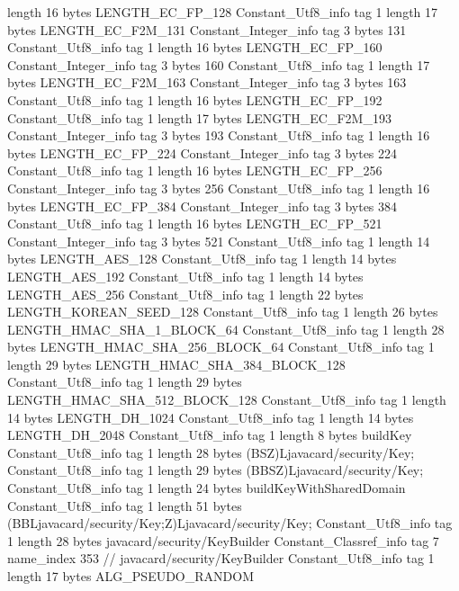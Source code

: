 {{{			length	16
			bytes	LENGTH_EC_FP_128
		}
		Constant_Utf8_info {
			tag	1
			length	17
			bytes	LENGTH_EC_F2M_131
		}
		Constant_Integer_info {
			tag	3
			bytes	131
		}
		Constant_Utf8_info {
			tag	1
			length	16
			bytes	LENGTH_EC_FP_160
		}
		Constant_Integer_info {
			tag	3
			bytes	160
		}
		Constant_Utf8_info {
			tag	1
			length	17
			bytes	LENGTH_EC_F2M_163
		}
		Constant_Integer_info {
			tag	3
			bytes	163
		}
		Constant_Utf8_info {
			tag	1
			length	16
			bytes	LENGTH_EC_FP_192
		}
		Constant_Utf8_info {
			tag	1
			length	17
			bytes	LENGTH_EC_F2M_193
		}
		Constant_Integer_info {
			tag	3
			bytes	193
		}
		Constant_Utf8_info {
			tag	1
			length	16
			bytes	LENGTH_EC_FP_224
		}
		Constant_Integer_info {
			tag	3
			bytes	224
		}
		Constant_Utf8_info {
			tag	1
			length	16
			bytes	LENGTH_EC_FP_256
		}
		Constant_Integer_info {
			tag	3
			bytes	256
		}
		Constant_Utf8_info {
			tag	1
			length	16
			bytes	LENGTH_EC_FP_384
		}
		Constant_Integer_info {
			tag	3
			bytes	384
		}
		Constant_Utf8_info {
			tag	1
			length	16
			bytes	LENGTH_EC_FP_521
		}
		Constant_Integer_info {
			tag	3
			bytes	521
		}
		Constant_Utf8_info {
			tag	1
			length	14
			bytes	LENGTH_AES_128
		}
		Constant_Utf8_info {
			tag	1
			length	14
			bytes	LENGTH_AES_192
		}
		Constant_Utf8_info {
			tag	1
			length	14
			bytes	LENGTH_AES_256
		}
		Constant_Utf8_info {
			tag	1
			length	22
			bytes	LENGTH_KOREAN_SEED_128
		}
		Constant_Utf8_info {
			tag	1
			length	26
			bytes	LENGTH_HMAC_SHA_1_BLOCK_64
		}
		Constant_Utf8_info {
			tag	1
			length	28
			bytes	LENGTH_HMAC_SHA_256_BLOCK_64
		}
		Constant_Utf8_info {
			tag	1
			length	29
			bytes	LENGTH_HMAC_SHA_384_BLOCK_128
		}
		Constant_Utf8_info {
			tag	1
			length	29
			bytes	LENGTH_HMAC_SHA_512_BLOCK_128
		}
		Constant_Utf8_info {
			tag	1
			length	14
			bytes	LENGTH_DH_1024
		}
		Constant_Utf8_info {
			tag	1
			length	14
			bytes	LENGTH_DH_2048
		}
		Constant_Utf8_info {
			tag	1
			length	8
			bytes	buildKey
		}
		Constant_Utf8_info {
			tag	1
			length	28
			bytes	(BSZ)Ljavacard/security/Key;
		}
		Constant_Utf8_info {
			tag	1
			length	29
			bytes	(BBSZ)Ljavacard/security/Key;
		}
		Constant_Utf8_info {
			tag	1
			length	24
			bytes	buildKeyWithSharedDomain
		}
		Constant_Utf8_info {
			tag	1
			length	51
			bytes	(BBLjavacard/security/Key;Z)Ljavacard/security/Key;
		}
		Constant_Utf8_info {
			tag	1
			length	28
			bytes	javacard/security/KeyBuilder
		}
		Constant_Classref_info {
			tag	7
			name_index	353		// javacard/security/KeyBuilder
		}
		Constant_Utf8_info {
			tag	1
			length	17
			bytes	ALG_PSEUDO_RANDOM
}}}
